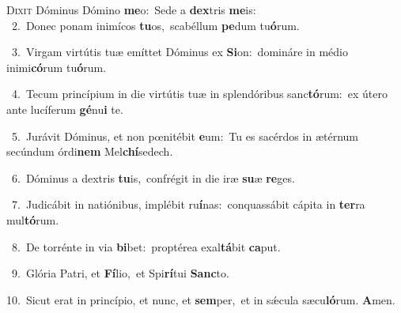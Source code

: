 \lettrine{\initial\textcolor{\initialcolor}{D}}{ixit} Dóminus Dómino \textbf{me}\-o:~\star Sede a \textbf{dex}\-tris \textbf{me}\-is:\\
{\numbfont\textcolor{\numbcolor}{~2.}}~Donec ponam inimícos \textbf{tu}\-os,~\star scabéllum \textbf{pe}\-dum tu\-\textbf{ó}\-rum.\par
{\numbfont\textcolor{\numbcolor}{~3.}}~Virgam virtútis tuæ emíttet Dóminus ex \textbf{Si}\-on:~\star domináre in médio inimi\-\textbf{có}\-rum tu\-\textbf{ó}\-rum.\par
{\numbfont\textcolor{\numbcolor}{~4.}}~Tecum princípium in die virtútis tuæ in splendóribus sanc\-\textbf{tó}\-rum:~\star ex útero ante lucíferum \textbf{gé}\-nu\textbf{i} te.\par
{\numbfont\textcolor{\numbcolor}{~5.}}~Jurávit Dóminus, et non pœnitébit \textbf{e}\-um:~\star Tu es sacérdos in ætérnum secúndum órdi\textbf{nem} Mel\-\textbf{chí}\-sedech.\par
{\numbfont\textcolor{\numbcolor}{~6.}}~Dóminus a dextris \textbf{tu}\-is,~\star confrégit in die iræ \textbf{su}\-æ \textbf{re}\-ges.\par
{\numbfont\textcolor{\numbcolor}{~7.}}~Judicábit in natiónibus, implébit ru\-\textbf{í}\-nas:~\star conquassábit cápita in \textbf{ter}\-ra mul\-\textbf{tó}\-rum.\par
{\numbfont\textcolor{\numbcolor}{~8.}}~De torrénte in via \textbf{bi}\-bet:~\star proptérea exal\-\textbf{tá}\-bit \textbf{ca}\-put.\par
{\numbfont\textcolor{\numbcolor}{~9.}}~Glória Patri, et \textbf{Fí}\-lio,~\star et Spi\-\textbf{rí}\-tui \textbf{Sanc}\-to.\par
{\numbfont\textcolor{\numbcolor}{10.}}~Sicut erat in princípio, et nunc, et \textbf{sem}\-per,~\star et in sǽcula sæcu\-\textbf{ló}\-rum. \textbf{A}\-men.\par
